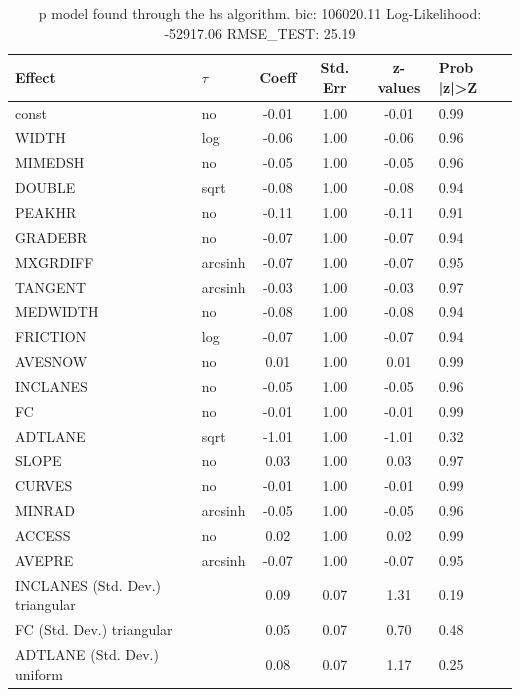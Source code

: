 \begin{table}
	\caption{p model found through the hs algorithm. bic: 106020.11 Log-Likelihood: -52917.06 RMSE_TEST: 25.19}
	\begin{center}
		\begin{tabular}{|l|l|c|c|c|l|}
			\hline
			Effect & $\tau$ & Coeff & Std. Err & z-values & Prob |z|>Z \\
			\hline
			const & no & -0.01 & 1.00 & -0.01 & 0.99 \\
			\hline
			WIDTH & log & -0.06 & 1.00 & -0.06 & 0.96 \\
			\hline
			MIMEDSH & no & -0.05 & 1.00 & -0.05 & 0.96 \\
			\hline
			DOUBLE & sqrt & -0.08 & 1.00 & -0.08 & 0.94 \\
			\hline
			PEAKHR & no & -0.11 & 1.00 & -0.11 & 0.91 \\
			\hline
			GRADEBR & no & -0.07 & 1.00 & -0.07 & 0.94 \\
			\hline
			MXGRDIFF & arcsinh & -0.07 & 1.00 & -0.07 & 0.95 \\
			\hline
			TANGENT & arcsinh & -0.03 & 1.00 & -0.03 & 0.97 \\
			\hline
			MEDWIDTH & no & -0.08 & 1.00 & -0.08 & 0.94 \\
			\hline
			FRICTION & log & -0.07 & 1.00 & -0.07 & 0.94 \\
			\hline
			AVESNOW & no & 0.01 & 1.00 & 0.01 & 0.99 \\
			\hline
			INCLANES & no & -0.05 & 1.00 & -0.05 & 0.96 \\
			\hline
			FC & no & -0.01 & 1.00 & -0.01 & 0.99 \\
			\hline
			ADTLANE & sqrt & -1.01 & 1.00 & -1.01 & 0.32 \\
			\hline
			SLOPE & no & 0.03 & 1.00 & 0.03 & 0.97 \\
			\hline
			CURVES & no & -0.01 & 1.00 & -0.01 & 0.99 \\
			\hline
			MINRAD & arcsinh & -0.05 & 1.00 & -0.05 & 0.96 \\
			\hline
			ACCESS & no & 0.02 & 1.00 & 0.02 & 0.99 \\
			\hline
			AVEPRE & arcsinh & -0.07 & 1.00 & -0.07 & 0.95 \\
			\hline
			INCLANES (Std. Dev.) triangular &  & 0.09 & 0.07 & 1.31 & 0.19 \\
			\hline
			FC (Std. Dev.) triangular &  & 0.05 & 0.07 & 0.70 & 0.48 \\
			\hline
			ADTLANE (Std. Dev.) uniform &  & 0.08 & 0.07 & 1.17 & 0.25 \\

\end{tabular}
\end{center}
\end{table}
